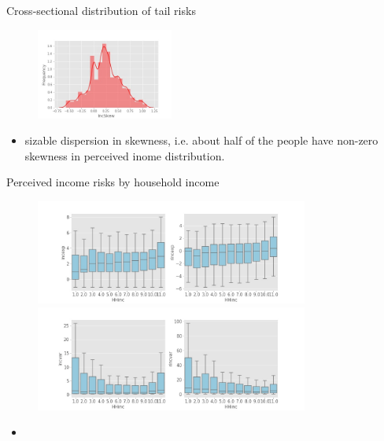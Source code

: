 \documentclass{beamer}
\begin{document}
\begin{frame}{Cross-sectional distribution of tail risks}
	\begin{figure}
		\centering
		\label{incvar_skew}
		\includegraphics[width=0.4\textwidth]{figures/histIncSkew}
	\end{figure}
	\begin{itemize}
		\item sizable dispersion in skewness, i.e. about half of the people have non-zero skewness in perceived inome distribution. 
	\end{itemize}
\end{frame}


\begin{frame}{Perceived income risks by household income}
	\begin{figure}
		\centering
		\label{boxplot_hhinc}
		\includegraphics[width=0.8\textwidth]{figures/boxplot_exp_HHinc} \\
		\includegraphics[width=0.8\textwidth]{figures/boxplot_var_HHinc}
	\end{figure}
	\begin{itemize}
		\item 
	\end{itemize}
\end{frame}
\end{document}
